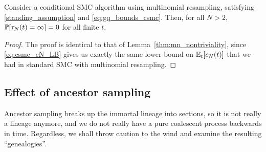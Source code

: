 \begin{lemma}\label{thm:CSMC_nontriviality}
Consider a conditional SMC algorithm using multinomial resampling, satisfying \ref{standing_assumption} and \eqref{eq:gq_bounds_csmc}. 
Then, for all $N>2$, $\mathbb{P}[ \tau_N(t) = \infty ]=0$ for all finite $t$.
\end{lemma}

\begin{proof}
The proof is identical to that of Lemma~\ref{thm:mn_nontriviality}, since \eqref{eq:csmc_cN_LB} gives us exactly the same lower bound on $\mathbb{E}_t [ c_N(t) ]$ that we had in standard SMC with multinomial resampling.
\end{proof}


\subsection{Effect of ancestor sampling}
Ancestor sampling breaks up the immortal lineage into sections, so it is not really a lineage anymore, and we do not really have a pure coalescent process backwards in time. Regardless, we shall throw caution to the wind and examine the resulting ``genealogies''.

